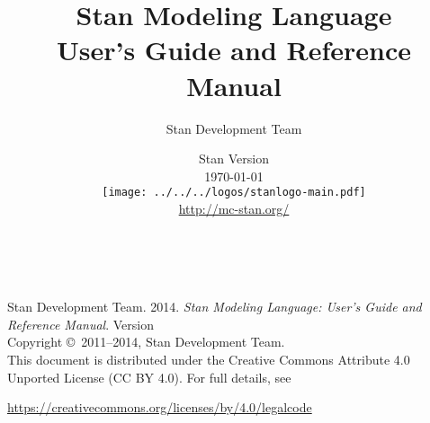 \title{\Huge\bf Stan Modeling Language \\[4pt] {\LARGE User's Guide
    and Reference Manual}}
\author{Stan Development Team}

\date{\vspace*{36pt} Stan Version \stanversion
\\[8pt] {\small \today}
\\[36pt]
{
\vfill
\texttt{[image: ../../../logos/stanlogo-main.pdf]}}
\\
\vspace*{6pt}
{\small \url{http://mc-stan.org/}}
}
\maketitle

\newpage
\thispagestyle{empty}
\mbox{ }
\vfill
\begin{center}
\begin{minipage}[t]{0.75\textwidth}
\small
Stan Development Team. 2014.  
{\it Stan Modeling Language: User's Guide and Reference Manual}. Version
\stanversion
\vspace*{20pt}
\mbox{ }
\\
Copyright \copyright \ 2011--2014, Stan Development Team.
\vspace*{28pt}
\mbox{} \\
This document is distributed under the Creative Commons Attribute 4.0
Unported License (CC BY 4.0).  For full details, see
\begin{center}
\url{https://creativecommons.org/licenses/by/4.0/legalcode} 
\end{center}
\end{minipage}
\vspace*{24pt}
\mbox{ }
\end{center}
